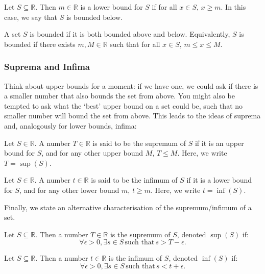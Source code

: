 \documentclass[
  12pt,
  a4paper]{extarticle}
\theoremstyle{plain}
\theoremstyle{definition}
\theoremstyle{plain}
\theoremstyle{plain}
\theoremstyle{plain}
\theoremstyle{plain}
\theoremstyle{definition}
\theoremstyle{definition}
\theoremstyle{remark}
\theoremstyle{remark}
\let\BeginKnitrBlock\begin \let\EndKnitrBlock\end
\renewcommand{\;}{\,}
\begin{document}
\BeginKnitrBlock{definition}[Lower Bound]
{\label{def:def7} }Let \(S \subseteq \mathbb{R}\). Then \(m \in \mathbb{R}\) is a lower bound for \(S\) if for all \(x \in S\), \(x \geq m\). In this case, we say that \(S\) is bounded below.
\EndKnitrBlock{definition}

\BeginKnitrBlock{definition}[Bounded Set]
{\label{def:def8} }A set \(S\) is bounded if it is both bounded above and below. Equivalently, \(S\) is bounded if there exists \(m, M \in \mathbb{R}\) such that for all \(x \in S\), \(m\leq x \leq M\).
\EndKnitrBlock{definition}

\hypertarget{suprema-and-infima}{%
\subsubsection{Suprema and Infima}\label{suprema-and-infima}}

Think about upper bounds for a moment: if we have one, we could ask if there is a smaller number that also bounds the set from above. You might also be tempted to ask what the `best' upper bound on a set could be, such that no smaller number will bound the set from above. This leads to the ideas of suprema and, analogously for lower bounds, infima:

\BeginKnitrBlock{definition}[Supremum]
{\label{def:def9} }Let \(S \in \mathbb{R}\). A number \(T \in \mathbb{R}\) is said to be the supremum of \(S\) if it is an upper bound for \(S\), and for any other upper bound \(M\), \(T \leq M\). Here, we write \(T = \sup(S)\).
\EndKnitrBlock{definition}

\BeginKnitrBlock{definition}[Infimum]
{\label{def:def10} }Let \(S \in \mathbb{R}\). A number \(t \in \mathbb{R}\) is said to be the infimum of \(S\) if it is a lower bound for \(S\), and for any other lower bound \(m\), \(t\geq m\). Here, we write \(t = \inf(S)\).
\EndKnitrBlock{definition}

Finally, we state an alternative characterisation of the supremum/infimum of a set.
\BeginKnitrBlock{proposition}
{\label{prp:prop2} }Let \(S\subseteq\mathbb{R}\). Then a number \(T\in\mathbb{R}\) is the supremum of \(S\), denoted \(\sup(S)\) if: \[\forall \epsilon > 0, \exists s \in S\; \text{such that} \; s > T - \epsilon.\]
\EndKnitrBlock{proposition}

\BeginKnitrBlock{proposition}
{\label{prp:prop3} }Let \(S\subseteq\mathbb{R}\). Then a number \(t\in\mathbb{R}\) is the infimum of \(S\), denoted \(\inf(S)\) if: \[\forall \epsilon > 0, \exists s \in S\; \text{such that} \; s < t + \epsilon.\]
\EndKnitrBlock{proposition}
\end{document}
